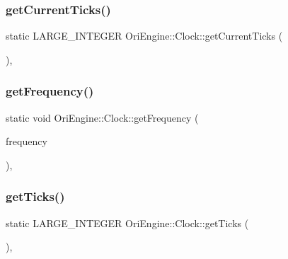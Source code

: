 \hypertarget{class_ori_engine_1_1_clock_aa084e2f95ad8ef19c2b346cd98b76cf1}{}\label{class_ori_engine_1_1_clock_aa084e2f95ad8ef19c2b346cd98b76cf1} 
\subsubsection{\texorpdfstring{get\+Current\+Ticks()}{getCurrentTicks()}}
{\footnotesize\ttfamily static L\+A\+R\+G\+E\+\_\+\+I\+N\+T\+E\+G\+ER Ori\+Engine\+::\+Clock\+::get\+Current\+Ticks (\begin{DoxyParamCaption}{ }\end{DoxyParamCaption})\hspace{0.3cm}{\ttfamily [inline]}, {\ttfamily [static]}}

\hypertarget{class_ori_engine_1_1_clock_aef03f6bf516fba7b5e79c9dd8b4d1f60}{}\label{class_ori_engine_1_1_clock_aef03f6bf516fba7b5e79c9dd8b4d1f60} 
\subsubsection{\texorpdfstring{get\+Frequency()}{getFrequency()}}
{\footnotesize\ttfamily static void Ori\+Engine\+::\+Clock\+::get\+Frequency (\begin{DoxyParamCaption}\item[{L\+A\+R\+G\+E\+\_\+\+I\+N\+T\+E\+G\+ER}]{frequency }\end{DoxyParamCaption})\hspace{0.3cm}{\ttfamily [inline]}, {\ttfamily [static]}}

\hypertarget{class_ori_engine_1_1_clock_a1963f95715596314a277e77401e42e38}{}\label{class_ori_engine_1_1_clock_a1963f95715596314a277e77401e42e38} 
\subsubsection{\texorpdfstring{get\+Ticks()}{getTicks()}}
{\footnotesize\ttfamily static L\+A\+R\+G\+E\+\_\+\+I\+N\+T\+E\+G\+ER Ori\+Engine\+::\+Clock\+::get\+Ticks (\begin{DoxyParamCaption}{ }\end{DoxyParamCaption})\hspace{0.3cm}{\ttfamily [inline]}, {\ttfamily [static]}}

